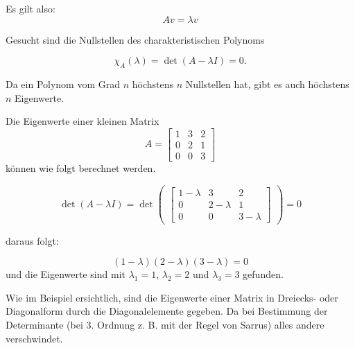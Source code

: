 Es gilt also:
\begin{equation}
	Av=\lambda v
\end{equation}

Gesucht sind die Nullstellen des charakteristischen Polynoms

\begin{equation}
	\chi_A(\lambda)=\det(A-\lambda I) = 0.
\end{equation}

 Da ein Polynom vom Grad $n$ höchstens $n$ Nullstellen hat, gibt es auch höchstens $n$ Eigenwerte.

\begin{beispiel}
Die Eigenwerte einer kleinen Matrix
	\begin{equation}
	A =
	\begin{bmatrix}
	1 & 3 & 2 \\
	0 & 2 & 1 \\
	0 & 0 & 3
	\end{bmatrix}
	\end{equation}
können wie folgt berechnet werden.
	
	\begin{equation}
	\det(A-\lambda I)= \det
	\begin{pmatrix}
	\begin{bmatrix}
	1-\lambda & 3 & 2 \\
	0 & 2-\lambda & 1 \\
	0 & 0 & 3-\lambda
	\end{bmatrix}
	\end{pmatrix}
	= 0
	\end{equation}
	
daraus folgt:
	
	\begin{equation} 
	(1-\lambda)(2-\lambda)(3-\lambda)=0
	\end{equation}
und die Eigenwerte sind mit $\lambda_{1}=1$, $\lambda_{2}=2$ und $\lambda_{3}=3$ gefunden.
\end{beispiel}

Wie im Beispiel ersichtlich, sind die Eigenwerte einer Matrix in Dreiecks- oder Diagonalform durch die Diagonalelemente gegeben.
Da bei Bestimmung der Determinante (bei 3. Ordnung z. B. mit der Regel von Sarrus) alles andere verschwindet.

